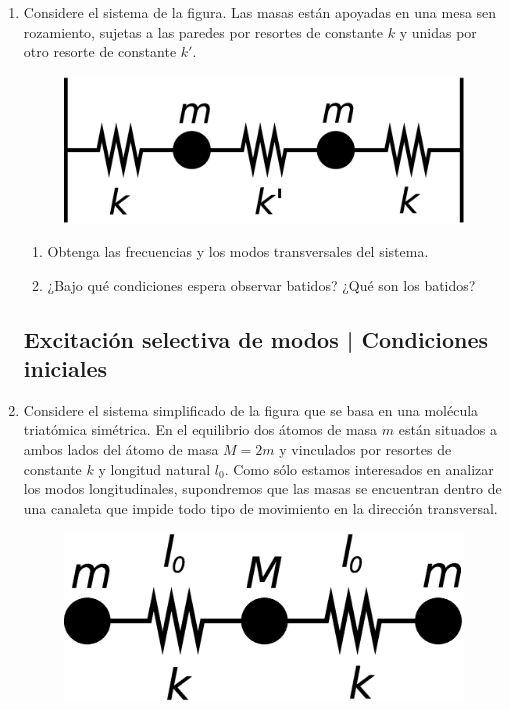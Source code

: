 \documentclass[11pt,spanish,a4paper]{article}
\begin{document}
\begin{enumerate}
\item Considere el sistema de la figura. Las masas están apoyadas en una
mesa sen rozamiento, sujetas a las paredes por resortes de constante
$k$ y unidas por otro resorte de constante $k'$. 
\begin{figure}[H]
\centering{}\includegraphics[clip,scale=0.25]{ej1-8}
\end{figure}
\begin{enumerate}
\item Obtenga las frecuencias y los modos transversales del sistema. 
\item ¿Bajo qué condiciones espera observar batidos? ¿Qué son los batidos?
\end{enumerate}



\subsection*{Excitación selectiva de modos | Condiciones iniciales}


\item Considere el sistema simplificado de la figura que se basa en una
molécula triatómica simétrica. En el equilibrio dos átomos de masa
$m$ están situados a ambos lados del átomo de masa $M=2m$ y vinculados
por resortes de constante $k$ y longitud natural $l_{0}$. Como sólo
estamos interesados en analizar los modos longitudinales, supondremos
que las masas se encuentran dentro de una canaleta que impide todo
tipo de movimiento en la dirección transversal. 
\begin{figure}[H]
\centering{}\includegraphics[clip,scale=0.25]{ej1-9}
\end{figure}



\end{enumerate}
\end{document}
